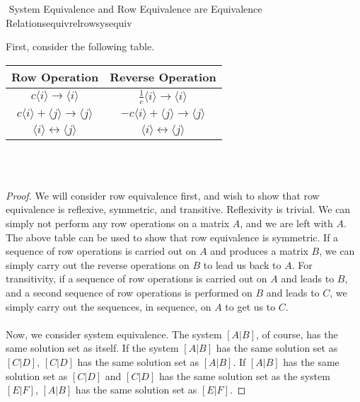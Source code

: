     \begin{theorem}{\Stop\,\,System Equivalence and Row Equivalence are Equivalence Relations}{equivrelrowsysequiv}
    
        First, consider the following table.
        \begin{center}
            \begin{tabular}{|c|c|}
                \hline
                \hline
                Row Operation & Reverse Operation \\
                \hline
                \hline
                \(c\langle i\rangle \to \langle i\rangle\) & \(\frac{1}{c}\langle i\rangle \to \langle i \rangle\) \\
                \hline
                \(c\langle i \rangle+\langle j \rangle \to\langle j\rangle\) & \(-c\langle i \rangle+\langle j \rangle\to\langle j \rangle\) \\
                \hline
                \(\langle i \rangle \leftrightarrow \langle j \rangle\) & \(\langle i \rangle \leftrightarrow \langle j \rangle\) \\
                \hline
            \end{tabular}
        \end{center}
        \vphantom
        \\
        \\
        \begin{proof}
            We will consider row equivalence first, and wish to show that row equivalence is reflexive, symmetric, and transitive. Reflexivity is trivial. We can simply not perform any row operations on a matrix \(A\), and we are left with \(A\). The above table can be used to show that row equivalence is symmetric. If a sequence of row operations is carried out on \(A\) and produces a matrix \(B\), we can simply carry out the reverse operations on \(B\) to lead us back to \(A\). For transitivity, if a sequence of row operations is carried out on \(A\) and leads to \(B\), and a second sequence of row operations is performed on \(B\) and leads to \(C\), we simply carry out the sequences, in sequence, on \(A\) to get us to \(C\).
            \\
            \\
            Now, we consider system equivalence. The system \([A|B]\), of course, has the same solution set as itself. If the system \([A|B]\) has the same solution set as \([C|D]\), \([C|D]\) has the same solution set as \([A|B]\). If \([A|B]\) has the same solution set as \([C|D]\) and \([C|D]\) has the same solution set as the system \([E|F]\), \([A|B]\) has the same solution set as \([E|F]\).
        \end{proof}
        
    \end{theorem}

